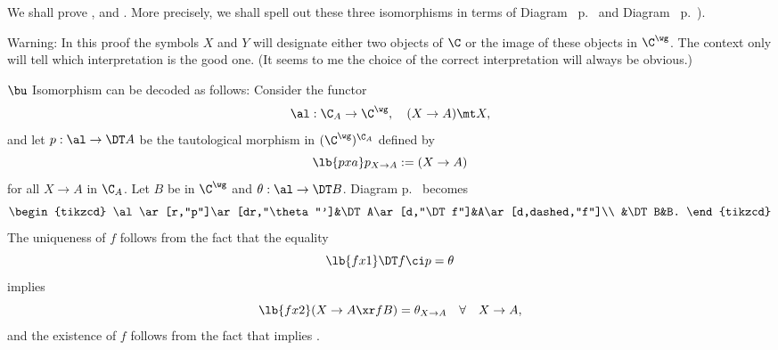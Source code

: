 \documentclass[12pt]{article}
\theoremstyle{remark}
\theoremstyle{definition}
\begin{document}

\begin{s}
We shall prove ,  and . More precisely, we shall spell out these three isomorphisms in terms of Diagram~ p.~ and Diagram~ p.~). 

Warning: In this proof the symbols $X$ and $Y$ will designate either two objects of $\C$ or the image of these objects in $\C^\wg$. The context only will tell which interpretation is the good one. (It seems to me the choice of the correct interpretation will always be obvious.)

\nn$\bu$ Isomorphism  can be decoded as follows: Consider the functor 
$$
\al:\C_A\to\C^\wg,\quad(X\to A)\mt X,
$$ 
and let $p:\al\to\DT A$ be the tautological morphism in $(\C^\wg)^{\C_A}$ defined by 
\begin{equation}\lb{pxa}
p_{X\to A}:=(X\to A)
\end{equation}
for all $X\to A$ in $\C_A$. Let $B$ be in $\C^\wg$ and $\theta:\al\to\DT B$. Diagram  p.~ becomes 
$$
\begin{tikzcd}
\al\ar[r,"p"]\ar[dr,"\theta"']&\DT A\ar[d,"\DT f"]&A\ar[d,dashed,"f"]\\ 
&\DT B&B.
\end{tikzcd}
$$  
The uniqueness of $f$ follows from the fact that the equality 
\begin{equation}\lb{fx1}
\DT f\ci p=\theta
\end{equation} 
implies 
\begin{equation}\lb{fx2} 
(X\to A\xr fB)=\theta_{X\to A}\quad\forall\quad X\to A,
\end{equation} 
and the existence of $f$ follows from the fact that  implies . %


\end{s}
\end{document}
